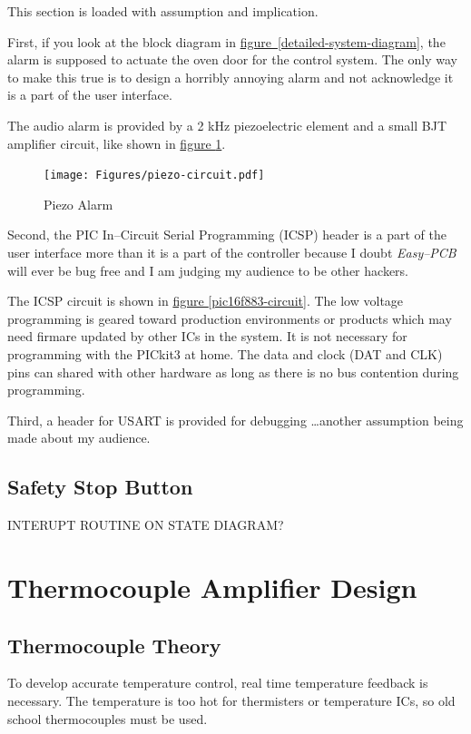 \documentclass[10pt, twocolumn]{article}
\begin{document}
This section is loaded with assumption and implication.

First, if you look at the block diagram in
\mbox{\hyperref[detailed-system-diagram]{figure \ref{detailed-system-diagram}}},
the alarm is supposed to actuate the oven door for the control system.
The only way to make this true is to design a horribly annoying alarm
and not acknowledge it is a part of the user interface.

The audio alarm is provided by a 2 kHz piezoelectric element and a small BJT
amplifier circuit, like shown in
\hyperref[piezo-circuit]{figure \ref{piezo-circuit}}.

\begin{figure}
	\centering
	\texttt{[image: Figures/piezo-circuit.pdf]}
	\caption{Piezo Alarm}
	\label{piezo-circuit}
\end{figure}

Second, the PIC In--Circuit Serial Programming (ICSP) header is a part of the user
interface more than it is a part of the controller because I doubt \emph{Easy--PCB}
will ever be bug free and I am judging my audience to be other hackers.

The ICSP circuit is shown in
\hyperref[pic16f883-circuit]{figure \ref{pic16f883-circuit}}.
The low voltage programming is geared toward production environments
or products which may need firmare updated by other ICs in the system.
It is not necessary for programming with the PICkit3 at home.
The data and clock (DAT and CLK) pins can shared with other hardware
as long as there is no bus contention during programming.

Third, a header for USART is provided for debugging
\ldots another assumption being made about my audience.

\subsection{Safety Stop Button}

INTERUPT ROUTINE ON STATE DIAGRAM?

\section{Thermocouple Amplifier Design}

\subsection{Thermocouple Theory}

To develop accurate temperature control, real time temperature feedback
is necessary. The temperature is too hot for thermisters or temperature ICs,
so old school thermocouples must be used.
\end{document}
